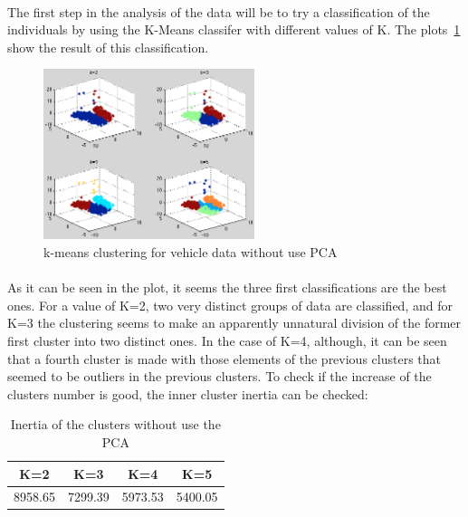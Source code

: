 \documentclass[12pt, a4paper]{article}
\begin{document}
\paragraph{}The first step in the analysis of the data will be to try a classification of the individuals by using the K-Means classifer with different values of K. The plots~\ref{fig:Car_1} show the result of this classification.
\begin{figure}[ht!]
	\centering
	\includegraphics[width=0.55\textwidth]{img/Cars_1}
	\caption{k-means clustering for vehicle data without use PCA}
	\label{fig:Car_1}
\end{figure}
\paragraph{}As it can be seen in the plot, it seems the three first classifications are the best ones. For a value of K=2, two  very distinct groups of data are classified, and for K=3 the clustering seems to make an apparently unnatural division of the former first cluster into two distinct ones. In the case of K=4, although, it can be seen that a fourth cluster is made with those elements of the previous clusters that seemed to be outliers  in the previous clusters. To check if the increase of the clusters number is good, the inner cluster inertia can be checked:
\begin{table}[ht!]
	\centering
	\begin{tabular}{|c|c|c|c|}
		\hline
		\rowcolor[gray]{0.85} \textbf{K=2}&\textbf{K=3}&\textbf{K=4}&\textbf{K=5}\\\hline
		8958.65&7299.39&5973.53&5400.05\\\hline
	\end{tabular}
	\caption{Inertia of the clusters without use the PCA}
\end{table}
\end{document}
